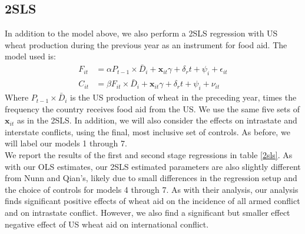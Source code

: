 \documentclass{article}
\newcommand{\x}{\mathbf x}
\begin{document}
\subsection{2SLS }
In addition to the model above, we also perform a 2SLS regression with US wheat production during the previous year as an instrument for food aid. The model used is:
\begin{align*}
F_{it} &= \alpha P_{t-1}\times \bar D_{i} +  \x_{it} \gamma +  \delta_r t + \psi_{i} + \epsilon_{it}\\
C_{it} &= \beta  F_{it} \times \bar D_{i}+ \x_{it} \gamma +  \delta_r t + \psi_{i} + \nu_{it}
\end{align*}
Where $P_{t-1}\times \bar D_{i}$ is the US production of wheat in the preceding year, times the frequency the country receives food aid from the US. We use the same five sets of $\x_{it}$ as in the 2SLS. In addition, we will also consider the effects on intrastate and interstate conflicts, using the final, most inclusive set of controls. As before, we will label our models 1 through 7. \\

We report the results of the first and second stage regressions in table \ref{2sls}. As with our OLS estimates, our 2SLS estimated parameters are also slightly different from Nunn and Qian's, likely due to small differences in the regression setup and the choice of controls for models 4 through 7. As with their analysis, our analysis finds significant positive effects of wheat aid on the incidence of all armed conflict and on intrastate conflict. However, we also find a significant but smaller effect negative effect of US wheat aid on international conflict. 
\end{document}
